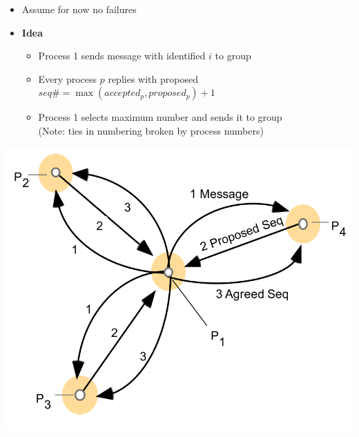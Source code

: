 \begin{minipage}{0.37\textwidth}
\begin{itemize}
\item Assume for now no failures
\item \textbf{Idea}
  \begin{itemize}
  \item Process 1 sends message with identified $i$ to group
  \item Every process $p$ replies with proposed \\
    $seq\# = \max(accepted_p, proposed_p) +1$
  \item Process 1 selects maximum number and sends it to group \\
    (Note: ties in numbering broken by process numbers)
  \end{itemize}
\end{itemize}
\end{minipage}%
\begin{minipage}{0.2\textwidth}
  \includegraphics[scale=0.1]{graphics/isis.png}
\end{minipage}


